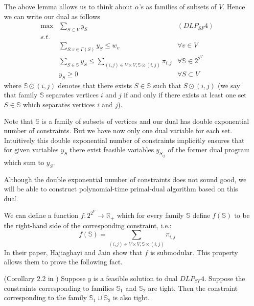 The above lemma allows us to think about $\alpha$'s as families of subsets of $V$. Hence we can write our dual as follows
\begin{align}
\text{max} & \sum_{S \subset V} y_S & (DLP_{SF} 4) \nonumber\\
s.t. \nonumber\\
& \sum_{S:v\in\Gamma(S)} y_S \leq w_v																& \forall v \in V \label{ForestConstraint1}\\
& \sum_{S\in \mathbb{S}} y_S \leq \sum_{(i,j) \in V \times V, \mathbb{S}\odot(i,j)} \pi_{i,j}		& \forall \mathbb{S} \in 2^{2^V}\label{ForestConstraint2}\\
& y_S \geq 0																						& \forall S \subset V \nonumber
\end{align}
where $\mathbb{S}\odot(i,j)$ denotes that there exists $S \in \mathbb{S}$ such that $S \odot (i,j)$ (we say that family $\mathbb{S}$ separates vertices $i$ and $j$ if and only if there exists at least one set $S \in \mathbb{S}$ which separates vertices $i$ and $j$).

Note that $\mathbb{S}$ is a family of subsets of vertices and our dual has double exponential number of constraints. But we have now only one dual variable for each set. Intuitively this double exponential number of constraints implicitly ensures that for given variables $y_S$ there exist feasible variables $y_{S_{ij}}$ of the former dual program which sum to $y_S$.

Although the double exponential number of constraints does not sound good, we will be able to construct polynomial-time primal-dual algorithm based on this dual.

We can define a function $f : 2^{2^V} \rightarrow \mathbb{R}_+$ which for every family $\mathbb{S}$ define $f(\mathbb{S})$ to be the right-hand side of the corresponding constraint, i.e.:
$$f(\mathbb{S}) = \sum_{(i,j) \in V \times V, \mathbb{S}\odot(i,j)} \pi_{i,j}$$
In their paper, Hajiaghayi and Jain show that $f$ is submodular. This property allows them to prove the following fact.
\begin{fact} (Corollary 2.2 in \cite{Hajiaghayi})
\label{SumTight}
Suppose $y$ is a feasible solution to dual $DLP_{SF} 4$. Suppose the constraints corresponding to families $\mathbb{S}_1$ and $\mathbb{S}_2$ are tight. Then the constraint corresponding to the family $\mathbb{S}_1 \cup \mathbb{S}_2$ is also tight.
\end{fact}
\newpage
